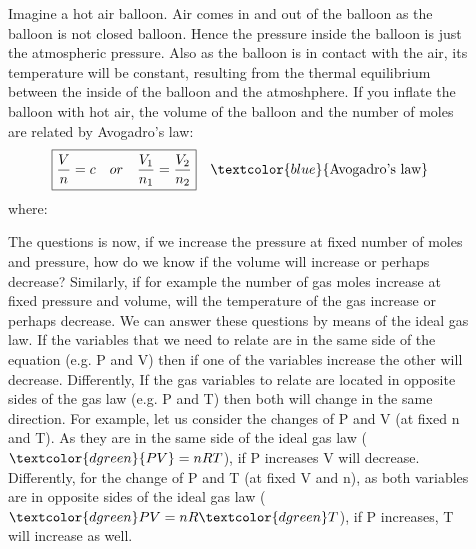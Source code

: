 \documentclass[main.tex]{subfiles}
\begin{document}
\begin{description}
\item[] 
Imagine a hot air balloon. Air comes in and out of the balloon as the balloon is not closed balloon. Hence the pressure inside the balloon is just the atmospheric pressure. Also as the balloon is in contact with the air, its temperature will be constant, resulting from the thermal equilibrium between the inside of the balloon and the atmoshphere. If you inflate the balloon with hot air, the volume of the balloon and the number of moles are related by Avogadro's law:
\begin{equation*}
\boxed{ \frac{V} {n}=c \quad or \quad   \frac{V_1} {n_1}=\frac{V_2} {n_2}} \quad \textcolor{blue}{\text{Avogadro's law}}
\end{equation*}
where:

\item[] 
The questions is now, if we increase the pressure at fixed number of moles and pressure, how do we know if the volume will increase or perhaps decrease? Similarly, if for example the number of gas moles increase at fixed pressure and volume, will the temperature of the gas increase or perhaps decrease. We can answer these questions by means of the ideal gas law. If the variables that we need to relate are in the same side of the equation (e.g. P and V) then if one of the variables increase the other will decrease. Differently, If the gas variables to relate are located in opposite sides of the gas law (e.g. P and T) then both will change in the same direction. For example, let us consider the changes of P and V (at fixed n and T). As they are in the same side of the ideal gas law ($\textcolor{dgreen}{PV}=nRT$), if P increases V will decrease. Differently, for the change of P and T (at fixed V and n), as both variables are in opposite sides of the ideal gas law ($\textcolor{dgreen}PV=nR\textcolor{dgreen}T$), if P increases, T will increase as well.
\end{description}
\end{document}
